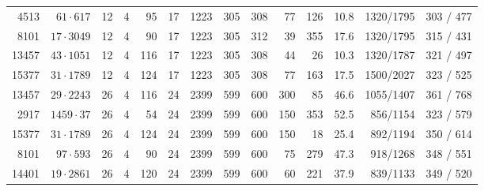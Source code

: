 \begin{table}[t]
{\begin{tabular}{@{}rrrrrrrrrrrrrr@{}}
4513 & $61\cdot617$ & 12 & 4 & 95 & 17 & 1223 & 305 & 308 & 77 & 126 & 10.8 & 1320/1795 & 303 / 477\\
8101 & $17\cdot3049$ & 12 & 4 & 90 & 17 & 1223 & 305 & 312 & 39 & 355 & 17.6 & 1320/1795 & 315 / 431\\
13457 & $43\cdot1051$ & 12 & 4 & 116 & 17 & 1223 & 305 & 308 & 44 & 26 & 10.3 & 1320/1787 & 321 / 497\\
15377 & $31\cdot1789$ & 12 & 4 & 124 & 17 & 1223 & 305 & 308 & 77 & 163 & 17.5 & 1500/2027 & 323 / 525\\
13457 & $29\cdot2243$ & 26 & 4 & 116 & 24 & 2399 & 599 & 600 & 300 & 85 & 46.6 & 1055/1407 & 361 / 768\\
2917 & $1459\cdot37$ & 26 & 4 & 54 & 24 & 2399 & 599 & 600 & 150 & 353 & 52.5 & 856/1154 & 323 / 579\\
15377 & $31\cdot1789$ & 26 & 4 & 124 & 24 & 2399 & 599 & 600 & 150 & 18 & 25.4 & 892/1194 & 350 / 614\\
8101 & $97\cdot593$ & 26 & 4 & 90 & 24 & 2399 & 599 & 600 & 75 & 279 & 47.3 & 918/1268 & 348 / 551\\
14401 & $19\cdot2861$ & 26 & 4 & 120 & 24 & 2399 & 599 & 600 & 60 & 221 & 37.9 & 839/1133 & 349 / 520\\
\bottomrule\end{tabular}}\end{table}
